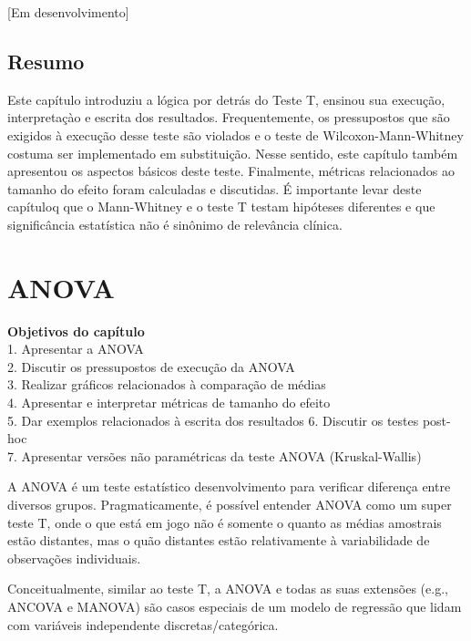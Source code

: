 \documentclass[
]{book}
\begin{document}
{[}Em desenvolvimento{]}

\hypertarget{resumo-1}{%
\section{Resumo}\label{resumo-1}}

Este capítulo introduziu a lógica por detrás do Teste T, ensinou sua execução, interpretaçào e escrita dos resultados. Frequentemente, os pressupostos que são exigidos à execução desse teste são violados e o teste de Wilcoxon-Mann-Whitney costuma ser implementado em substituição. Nesse sentido, este capítulo também apresentou os aspectos básicos deste teste. Finalmente, métricas relacionados ao tamanho do efeito foram calculadas e discutidas. É importante levar deste capítuloq que o Mann-Whitney e o teste T testam hipóteses diferentes e que significância estatística não é sinônimo de relevância clínica.

\hypertarget{anova}{%
\chapter{ANOVA}\label{anova}}

\begin{objectives}
\textbf{Objetivos do capítulo}\\
1. Apresentar a ANOVA\\
2. Discutir os pressupostos de execução da ANOVA\\
3. Realizar gráficos relacionados à comparação de médias\\
4. Apresentar e interpretar métricas de tamanho do efeito\\
5. Dar exemplos relacionados à escrita dos resultados 6. Discutir os
testes post-hoc\\
7. Apresentar versões não paramétricas da teste ANOVA (Kruskal-Wallis)
\end{objectives}

A ANOVA é um teste estatístico desenvolvimento para verificar diferença entre diversos grupos. Pragmaticamente, é possível entender ANOVA como um super teste T, onde o que está em jogo não é somente o quanto as médias amostrais estão distantes, mas o quão distantes estão relativamente à variabilidade de observações individuais.

Conceitualmente, similar ao teste T, a ANOVA e todas as suas extensões (e.g., ANCOVA e MANOVA) são casos especiais de um modelo de regressão que lidam com variáveis independente discretas/categórica.
\end{document}
